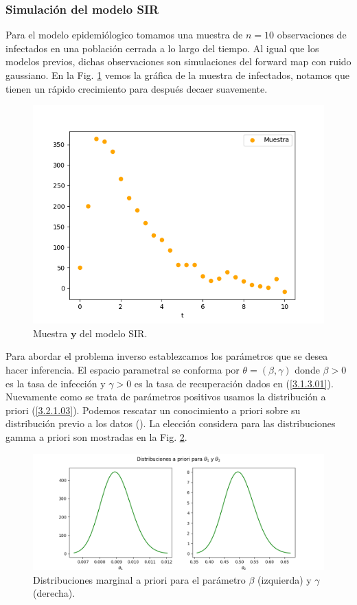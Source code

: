 \subsubsection{Simulación del modelo SIR}

Para el modelo epidemiólogico tomamos una muestra de $n =10$ observaciones de infectados en una población cerrada a lo largo del tiempo. Al igual que los modelos previos, dichas observaciones son simulaciones del forward map con ruido gaussiano. En la Fig. \ref{Fig. SIR_01} vemos la gráfica de la muestra de infectados, notamos que tienen un rápido crecimiento para después decaer suavemente.

\begin{figure}
    \centering 
    \includegraphics[width = 10 cm]{img/Exp_Central_SIR_sigma/Figuras/Generales/Muestra_SIR_sigma.png} 
    \caption{Muestra $\mathbf{y}$ del modelo SIR.}
    \label{Fig. SIR_01}
\end{figure} 

Para abordar el problema inverso establezcamos los parámetros que se desea hacer inferencia. El espacio parametral se conforma por $\theta = (\beta,\gamma)$ donde $\beta >0$ es la tasa de infección y $\gamma > 0$ es la tasa de recuperación dados en (\ref{3.1.3.01}). Nuevamente como se trata de parámetros positivos usamos la distribución a priori (\ref{3.2.1.03}). Podemos rescatar un conocimiento a priori sobre su distribución previo a los datos (\cite{weiss2013sir}). La elección considera para las distribuciones gamma a priori son mostradas en la Fig. \ref{Fig. SIR_02}.

\begin{figure}[H] 
    \centering 
    \includegraphics[width = 15 cm ]{img/Exp_Central_SIR_sigma/Figuras/Generales/Apriori_SIR_sigma.png} 
    \caption{Distribuciones marginal a priori para el parámetro $\beta$ (izquierda) y $\gamma$ (derecha).}
    \label{Fig. SIR_02}
\end{figure} 

